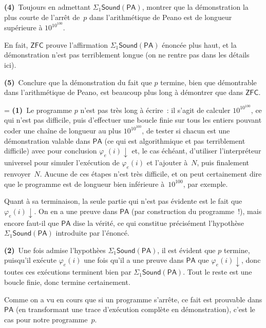 \documentclass[12pt,a4paper]{article}
\theoremstyle{definition}
\newif\ifcorrige
\newenvironment{corrige}%
{\ifcorrige\relax\else\setbox0=\vbox\bgroup\fi%
\smallbreak\footnotesize\noindent{\underbar{\textit{Corrigé.}}\quad}}
{{\hbox{}\nobreak\hfill\checkmark}%
\ifcorrige\relax\else\egroup\fi\par}
\begin{document}
\textbf{(4)} Toujours en admettant
$\Sigma_1\mathsf{Sound}(\mathsf{PA})$, montrer que la démonstration la
plus courte de l'arrêt de $p$ dans l'arithmétique de Peano est de
longueur supérieure à $10^{10^{100}}$.

En fait, $\mathsf{ZFC}$ prouve l'affirmation
$\Sigma_1\mathsf{Sound}(\mathsf{PA})$ énoncée plus haut, et la
démonstration n'est pas terriblement longue (on ne rentre pas dans les
détails ici).

\textbf{(5)} Conclure que la démonstration du fait que $p$ termine,
bien que démontrable dans l'arithmétique de Peano, est beaucoup plus
long à démontrer que dans $\mathsf{ZFC}$.

\begin{corrige}
\textbf{(1)} Le programme $p$ n'est pas très long à écrire : il s'agit
de calculer $10^{10^{100}}$, ce qui n'est pas difficile, puis
d'effectuer une boucle finie sur tous les entiers pouvant coder une
chaîne de longueur au plus $10^{10^{100}}$, de tester si chacun est
une démonstration valable dans $\mathsf{PA}$ (ce qui est algorithmique
et pas terriblement difficile) avec pour conclusion
$\varphi_e(i){\downarrow}$ et, le cas échéant, d'utiliser
l'interpréteur universel pour simuler l'exécution de $\varphi_e(i)$ et
l'ajouter à $N$, puis finalement renvoyer $N$.  Aucune de ces
étapes n'est très difficile, et on peut certainement dire que le
programme est de longueur bien inférieure à $10^{100}$, par exemple.

Quant à sa terminaison, la seule partie qui n'est pas évidente est le
fait que $\varphi_e(i){\downarrow}$.  On en a une preuve dans
$\mathsf{PA}$ (par construction du programme !), mais encore faut-il
que $\mathsf{PA}$ dise la vérité, ce qui constitue précisément
l'hypothèse $\Sigma_1\mathsf{Sound}(\mathsf{PA})$ introduite par
l'énoncé.

\textbf{(2)} Une fois admise l'hypothèes
$\Sigma_1\mathsf{Sound}(\mathsf{PA})$, il est évident que $p$ termine,
puisqu'il exécute $\varphi_e(i)$ une fois qu'il a une preuve dans
$\mathsf{PA}$ que $\varphi_e(i){\downarrow}$, donc toutes ces
exécutions terminent bien par $\Sigma_1\mathsf{Sound}(\mathsf{PA})$.
Tout le reste est une boucle finie, donc termine certainement.

Comme on a vu en cours que si un programme s'arrête, ce fait est
prouvable dans $\mathsf{PA}$ (en transformant une trace d'exécution
complète en démonstration), c'est le cas pour notre programme $p$.


\end{corrige}
\end{document}

